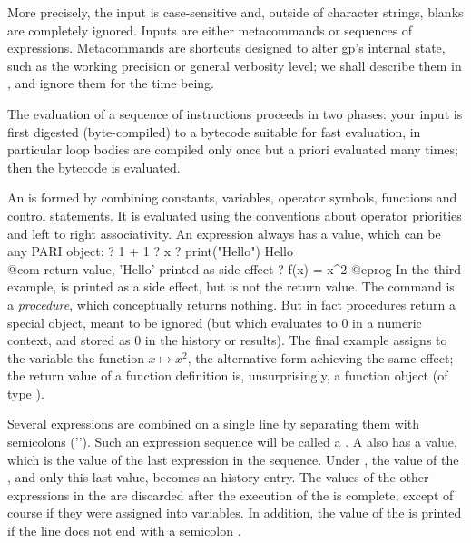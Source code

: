 More precisely, the input is case-sensitive and, outside of character
strings, blanks are completely ignored. Inputs are either metacommands or
sequences of expressions. Metacommands are shortcuts designed to alter gp's
internal state, such as the working precision or general verbosity level; we
shall describe them in , and ignore them for the time being.

The evaluation of a sequence of instructions proceeds in two phases: your
input is first digested (byte-compiled) to a bytecode suitable for fast
evaluation, in particular loop bodies are compiled only once but a priori
evaluated many times; then the bytecode is evaluated.

An  is formed by combining
constants, variables, operator symbols, functions and control statements.
It is evaluated using the conventions about operator priorities and left to
right associativity. An expression always has a value, which can be any PARI
object:
\bprog
? 1 + 1
? x
? print("Hello")
Hello           \\@com {} return value, 'Hello' printed as side effect
? f(x) = x^2
@eprog
\noindent In the third example,  is printed as a side effect, but
is not the return value. The  command is a \emph{procedure},
which conceptually returns nothing. But in fact procedures return a special
 object, meant to be ignored (but which evaluates
to $0$ in a numeric context, and stored as $0$ in the history or results).
The final example assigns to the variable  the function $x\mapsto
x^2$, the alternative form  achieving the same effect; the
return value of a function definition is, unsurprisingly, a function object
(of type ).

Several expressions are combined on a single line by separating them with
semicolons ('\kbd{;}'). Such an expression sequence will be called a
. A  also has a value, which is the value of the last
expression in the sequence. Under , the value of the , and
only this last value, becomes an history entry. The values of the other
expressions in the  are discarded after the execution of the
 is complete, except of course if they were assigned into variables.
In addition, the value of the  is printed if the line does not end
with a semicolon \kbd{;}.


